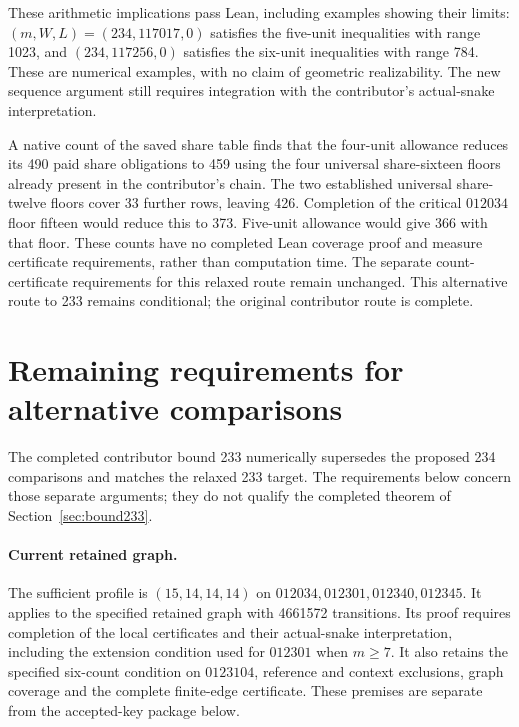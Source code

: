 \documentclass[11pt,a4paper]{article}
\theoremstyle{definition}
\theoremstyle{remark}
\begin{document}
These arithmetic implications pass Lean, including examples showing their
limits: $(m,W,L)=(234,117017,0)$ satisfies the five-unit inequalities with
range 1023, and $(234,117256,0)$ satisfies the six-unit inequalities with
range 784. These are numerical examples, with no claim of geometric
realizability. The new sequence argument still requires integration with
the contributor's actual-snake interpretation.

A native count of the saved share table finds that the four-unit allowance
reduces its 490 paid share obligations to 459 using the four universal
share-sixteen floors already present in the contributor's chain.
The two established universal share-twelve floors cover 33 further rows,
leaving 426. Completion of the critical $012034$ floor fifteen would
reduce this to 373. Five-unit allowance would give 366 with that floor.
These counts have no completed Lean coverage proof and measure certificate
requirements, rather than computation time. The separate count-certificate
requirements for this relaxed route remain unchanged. This alternative
route to 233 remains conditional; the original contributor route is complete.

\section{Remaining requirements for alternative comparisons}\label{sec:closure}
The completed contributor bound 233 numerically supersedes the proposed
234 comparisons and matches the relaxed 233 target. The requirements
below concern those separate arguments; they do not qualify the completed
theorem of Section~\ref{sec:bound233}.

\paragraph{Current retained graph.}
The sufficient profile is $(15,14,14,14)$ on
$012034,012301,012340,012345$. It applies to the specified retained
graph with 4661572 transitions. Its proof requires completion of the local
certificates and their actual-snake interpretation, including the
extension condition used for $012301$ when $m\ge7$. It also retains the
specified six-count condition on $0123104$, reference and context
exclusions, graph coverage and the complete finite-edge certificate.
These premises are separate from the accepted-key package below.
\end{document}
